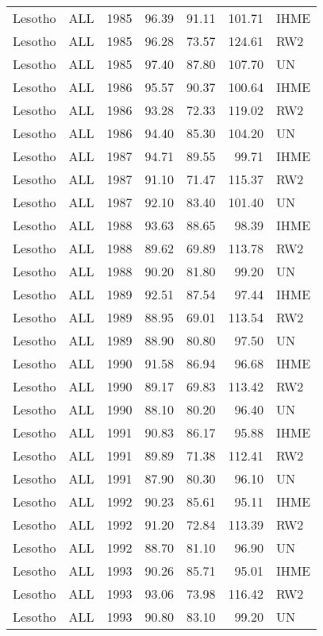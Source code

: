 \begin{longtable}{lllrrrl}
  Lesotho & ALL & 1985 & 96.39 & 91.11 & 101.71 & IHME \\ 
  Lesotho & ALL & 1985 & 96.28 & 73.57 & 124.61 & RW2 \\ 
  Lesotho & ALL & 1985 & 97.40 & 87.80 & 107.70 & UN \\ 
  Lesotho & ALL & 1986 & 95.57 & 90.37 & 100.64 & IHME \\ 
  Lesotho & ALL & 1986 & 93.28 & 72.33 & 119.02 & RW2 \\ 
  Lesotho & ALL & 1986 & 94.40 & 85.30 & 104.20 & UN \\ 
  Lesotho & ALL & 1987 & 94.71 & 89.55 & 99.71 & IHME \\ 
  Lesotho & ALL & 1987 & 91.10 & 71.47 & 115.37 & RW2 \\ 
  Lesotho & ALL & 1987 & 92.10 & 83.40 & 101.40 & UN \\ 
  Lesotho & ALL & 1988 & 93.63 & 88.65 & 98.39 & IHME \\ 
  Lesotho & ALL & 1988 & 89.62 & 69.89 & 113.78 & RW2 \\ 
  Lesotho & ALL & 1988 & 90.20 & 81.80 & 99.20 & UN \\ 
  Lesotho & ALL & 1989 & 92.51 & 87.54 & 97.44 & IHME \\ 
  Lesotho & ALL & 1989 & 88.95 & 69.01 & 113.54 & RW2 \\ 
  Lesotho & ALL & 1989 & 88.90 & 80.80 & 97.50 & UN \\ 
  Lesotho & ALL & 1990 & 91.58 & 86.94 & 96.68 & IHME \\ 
  Lesotho & ALL & 1990 & 89.17 & 69.83 & 113.42 & RW2 \\ 
  Lesotho & ALL & 1990 & 88.10 & 80.20 & 96.40 & UN \\ 
  Lesotho & ALL & 1991 & 90.83 & 86.17 & 95.88 & IHME \\ 
  Lesotho & ALL & 1991 & 89.89 & 71.38 & 112.41 & RW2 \\ 
  Lesotho & ALL & 1991 & 87.90 & 80.30 & 96.10 & UN \\ 
  Lesotho & ALL & 1992 & 90.23 & 85.61 & 95.11 & IHME \\ 
  Lesotho & ALL & 1992 & 91.20 & 72.84 & 113.39 & RW2 \\ 
  Lesotho & ALL & 1992 & 88.70 & 81.10 & 96.90 & UN \\ 
  Lesotho & ALL & 1993 & 90.26 & 85.71 & 95.01 & IHME \\ 
  Lesotho & ALL & 1993 & 93.06 & 73.98 & 116.42 & RW2 \\ 
  Lesotho & ALL & 1993 & 90.80 & 83.10 & 99.20 & UN \\ 

\end{longtable}
